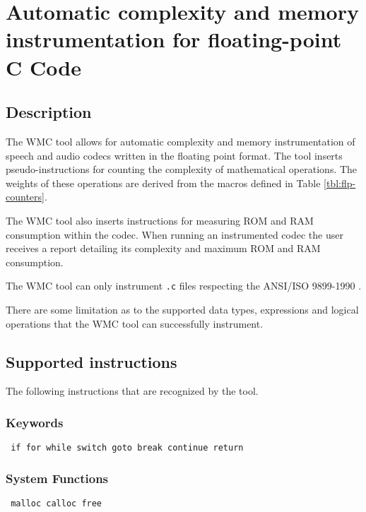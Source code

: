 \section{Automatic complexity and memory instrumentation for floating-point C Code}

\subsection{Description}

The WMC tool allows for automatic complexity and memory instrumentation of speech and audio codecs written in the floating point format.
The tool inserts pseudo-instructions for counting the complexity of mathematical operations.
The weights of these operations are derived from the macros defined in Table \ref{tbl:flp-counters}.

The WMC tool also inserts instructions for measuring ROM and RAM consumption within the codec.
When running an instrumented codec the user receives a report detailing its complexity and maximum ROM and RAM consumption.

The WMC tool can only instrument {\tt .c} files respecting the ANSI/ISO 9899-1990 \cite{C90}.

There are some limitation as to the supported data types, expressions and logical operations that the WMC tool can successfully instrument.

\subsection{Supported instructions}

The following instructions that are recognized by the tool.

\subsubsection{Keywords}
{\tt
    if for while switch goto break continue return
}

\subsubsection{System Functions}
{\tt
    malloc calloc free
}

